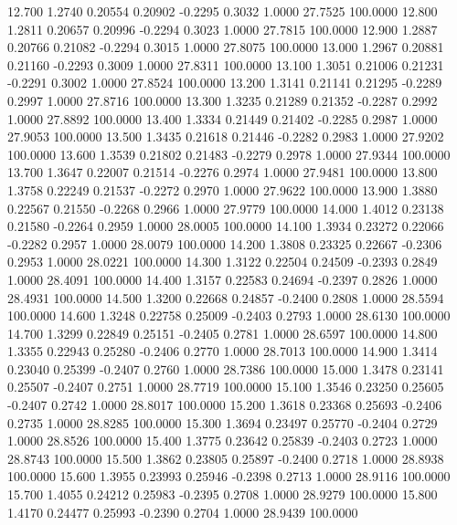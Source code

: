   12.700   1.2740   0.20554   0.20902  -0.2295   0.3032   1.0000  27.7525 100.0000
  12.800   1.2811   0.20657   0.20996  -0.2294   0.3023   1.0000  27.7815 100.0000
  12.900   1.2887   0.20766   0.21082  -0.2294   0.3015   1.0000  27.8075 100.0000
  13.000   1.2967   0.20881   0.21160  -0.2293   0.3009   1.0000  27.8311 100.0000
  13.100   1.3051   0.21006   0.21231  -0.2291   0.3002   1.0000  27.8524 100.0000
  13.200   1.3141   0.21141   0.21295  -0.2289   0.2997   1.0000  27.8716 100.0000
  13.300   1.3235   0.21289   0.21352  -0.2287   0.2992   1.0000  27.8892 100.0000
  13.400   1.3334   0.21449   0.21402  -0.2285   0.2987   1.0000  27.9053 100.0000
  13.500   1.3435   0.21618   0.21446  -0.2282   0.2983   1.0000  27.9202 100.0000
  13.600   1.3539   0.21802   0.21483  -0.2279   0.2978   1.0000  27.9344 100.0000
  13.700   1.3647   0.22007   0.21514  -0.2276   0.2974   1.0000  27.9481 100.0000
  13.800   1.3758   0.22249   0.21537  -0.2272   0.2970   1.0000  27.9622 100.0000
  13.900   1.3880   0.22567   0.21550  -0.2268   0.2966   1.0000  27.9779 100.0000
  14.000   1.4012   0.23138   0.21580  -0.2264   0.2959   1.0000  28.0005 100.0000
  14.100   1.3934   0.23272   0.22066  -0.2282   0.2957   1.0000  28.0079 100.0000
  14.200   1.3808   0.23325   0.22667  -0.2306   0.2953   1.0000  28.0221 100.0000
  14.300   1.3122   0.22504   0.24509  -0.2393   0.2849   1.0000  28.4091 100.0000
  14.400   1.3157   0.22583   0.24694  -0.2397   0.2826   1.0000  28.4931 100.0000
  14.500   1.3200   0.22668   0.24857  -0.2400   0.2808   1.0000  28.5594 100.0000
  14.600   1.3248   0.22758   0.25009  -0.2403   0.2793   1.0000  28.6130 100.0000
  14.700   1.3299   0.22849   0.25151  -0.2405   0.2781   1.0000  28.6597 100.0000
  14.800   1.3355   0.22943   0.25280  -0.2406   0.2770   1.0000  28.7013 100.0000
  14.900   1.3414   0.23040   0.25399  -0.2407   0.2760   1.0000  28.7386 100.0000
  15.000   1.3478   0.23141   0.25507  -0.2407   0.2751   1.0000  28.7719 100.0000
  15.100   1.3546   0.23250   0.25605  -0.2407   0.2742   1.0000  28.8017 100.0000
  15.200   1.3618   0.23368   0.25693  -0.2406   0.2735   1.0000  28.8285 100.0000
  15.300   1.3694   0.23497   0.25770  -0.2404   0.2729   1.0000  28.8526 100.0000
  15.400   1.3775   0.23642   0.25839  -0.2403   0.2723   1.0000  28.8743 100.0000
  15.500   1.3862   0.23805   0.25897  -0.2400   0.2718   1.0000  28.8938 100.0000
  15.600   1.3955   0.23993   0.25946  -0.2398   0.2713   1.0000  28.9116 100.0000
  15.700   1.4055   0.24212   0.25983  -0.2395   0.2708   1.0000  28.9279 100.0000
  15.800   1.4170   0.24477   0.25993  -0.2390   0.2704   1.0000  28.9439 100.0000
